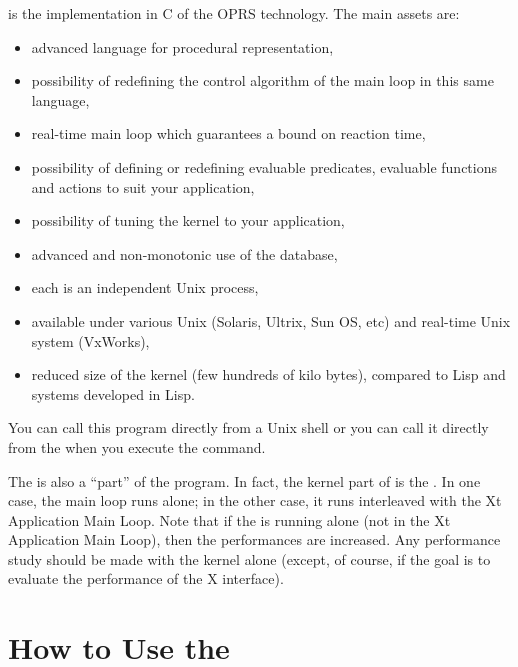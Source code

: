 \COPRS{} is the implementation in C of the OPRS technology. The \COPRS{} main assets
are:

\begin{itemize}

\item advanced language for procedural representation,

\item possibility of redefining the control algorithm of the main loop in
this same language,

\item real-time main loop which guarantees a bound on reaction time,

\item possibility of defining or redefining evaluable predicates,
evaluable functions and actions to suit your application,

\item possibility of tuning the kernel to your application,

\item advanced and non-monotonic use of the database,

\item each \CPK{} is an independent Unix process,

\item available under various Unix (Solaris, Ultrix, Sun OS, etc) and real-time
Unix system (VxWorks),

\item reduced size of the kernel (few hundreds of kilo bytes), compared
to Lisp and systems developed in Lisp.

\end{itemize}

You can call this program directly from a Unix shell or you can call it
directly from the \OPRSS{} when you execute the  command.

The \CPK{} is also a ``part'' of the \XOPRS{} program. In fact, the
kernel part of \XOPRS{} is the \CPK{}. In one case, the main loop
runs alone; in the other case, it runs interleaved with the Xt
Application Main Loop. Note that if the \CPK{} is running alone (not in
the Xt Application Main Loop), then the performances are increased. Any
performance study should be made with the kernel alone (except, of course,
if the goal is to evaluate the performance of the X interface).

\chapter{How to Use the \CPK{}}

